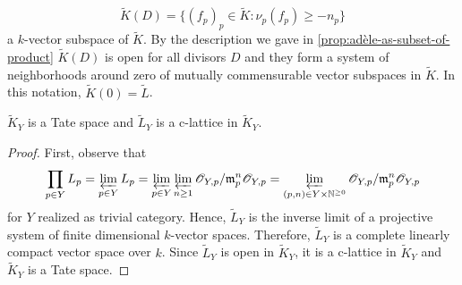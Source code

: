 \[
	\widetilde{K}(D) = \{(f_{p})_{p}\in \widetilde{K}\colon \nu_{p}(f_{p}) \geq -n_{p}\}
\]
a $k$-vector subspace of $\widetilde{K}$. By the description we gave in \cref{prop:adèle-as-subset-of-product} $\widetilde{K}(D)$ is open for all divisors $D$ and they form a system of neighborhoods around zero of mutually commensurable vector subspaces in $\widetilde{K}$. In this notation, $\widetilde{K}(0) = \widetilde{L}$.
\begin{proposition}\label{prop:adèle-is-a-tate-space}
	$\widetilde{K}_{Y}$ is a Tate space and $\widetilde{L}_{Y}$ is a c-lattice in $\widetilde{K}_{Y}$. 
\end{proposition}
\begin{proof}
	First, observe that
	\[
		\prod_{p\in Y} L_{p} = \varprojlim_{p\in Y} L_{p} = \varprojlim_{p\in Y}\varprojlim_{n\geq 1} {\mathscr O}_{Y,p}/\mathfrak{m}_{p}^{n}{\mathscr O}_{Y,p} = \varprojlim_{(p,n)\in Y\times {\mathbb N}^{\geq 0}} {\mathscr O}_{Y,p}/\mathfrak{m}_{p}^{n}{\mathscr O}_{Y,p}
	\] 
	for $Y$ realized as trivial category. Hence, $\widetilde{L}_{Y}$ is the inverse limit of a projective system of finite dimensional $k$-vector spaces. Therefore, $\widetilde{L}_{Y}$ is a complete linearly compact vector space over $k$. Since $\widetilde{L}_{Y}$ is open in $\widetilde{K}_{Y}$, it is a c-lattice in $\widetilde{K}_{Y}$ and $\widetilde{K}_{Y}$ is a Tate space.
\end{proof}

